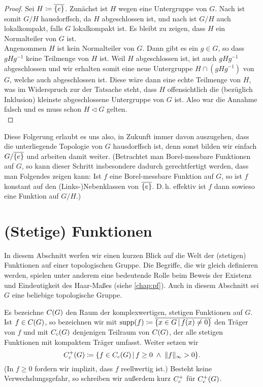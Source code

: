 \begin{proof}
    Sei $H\coloneqq \overline{\{e\}}$. 
    Zunächst ist $H$ wegen  eine Untergruppe von $G$.
    Nach  ist somit $G/H$ hausdorffsch, da $H$
    abgeschlossen ist, und nach  ist $G/H$ auch
    lokalkompakt, falls $G$ lokalkompakt ist. Es bleibt zu zeigen, dass $H$ ein
    Normalteiler von $G$ ist.
    \\
    Angenommen $H$ ist kein Normalteiler von $G$. Dann gibt es ein $g\in G$,
    so dass $gHg^{-1}$ keine Teilmenge von $H$ ist. Weil $H$ abgeschlossen ist,
    ist auch $gHg^{-1}$ abgeschlossen und wir erhalten somit eine neue
    Untergruppe $H \cap (gHg^{-1})$ von $G$, welche auch abgeschlossen ist.
    Diese wäre dann eine echte Teilmenge von $H$, was im Widerspruch zur
    der Tatsache steht, dass $H$ offensichtlich die (bezüglich Inklusion)
    kleinste abgeschlossene Untergruppe von $G$ ist. Also war die Annahme falsch
    und es muss schon $H\triangleleft G$ gelten.
    \\
\end{proof}

Diese Folgerung erlaubt es uns also, in Zukunft immer davon auszugehen, dass die
unterliegende Topologie von $G$ hausdorffsch ist, denn sonst bilden wir einfach
$G/\overline{\{e\}}$ und arbeiten damit weiter. (Betrachtet man Borel-messbare
Funktionen auf $G$, so kann dieser Schritt insbesondere dadurch gerechtfertigt
werden, dass man Folgendes zeigen kann: Ist $f$ eine Borel-messbare Funktion auf
$G$, so ist $f$ konstant auf den (Links-)Nebenklassen von $\overline{\{e\}}$.
D.\,h. effektiv ist $f$ dann sowieso eine Funktion auf $G/H$.)


\section{(Stetige) Funktionen}
In diesem Abschnitt werfen wir einen kurzen Blick auf die Welt der (stetigen)
Funktionen auf einer topologischen Gruppe. Die Begriffe, die wir gleich
definieren werden, spielen unter anderem eine bedeutende Rolle beim Beweis der
Existenz und Eindeutigkeit des Haar-Maßes (siehe \cref{chap:pf}).
Auch in diesem Abschnitt sei $G$ eine beliebige topologische Gruppe.

\begin{thNotation}
    \label{tg:notation:contcompsupp}
    Es bezeichne $C(G)$ den Raum der komplexwertigen, stetigen
    Funktionen auf $G$. Ist $f\in C(G)$, so bezeichnen wir mit 
    $\supp(f) \defeq \setclosure{ \{ x\in G \Mid f(x) \neq 0 \} }$
    den Träger von $f$ und mit $C_c(G)$ denjenigen Teilraum von
    $C(G)$, der alle stetigen Funktionen mit kompaktem Träger umfasst.
    Weiter setzen wir
    \[ \contcompplus(G) \defeq \{ f\in \contcomp(G) \Mid 
        f \geq 0 \;\wedge\; \supnorm{f} > 0 \}
    . \]
    (In $f\geq 0$ fordern wir implizit, dass $f$ reellwertig ist.)
    Besteht keine Verwechslungsgefahr, so schreiben wir außerdem kurz
    $C_c^+$ für $C_c^+(G)$.
\end{thNotation}

